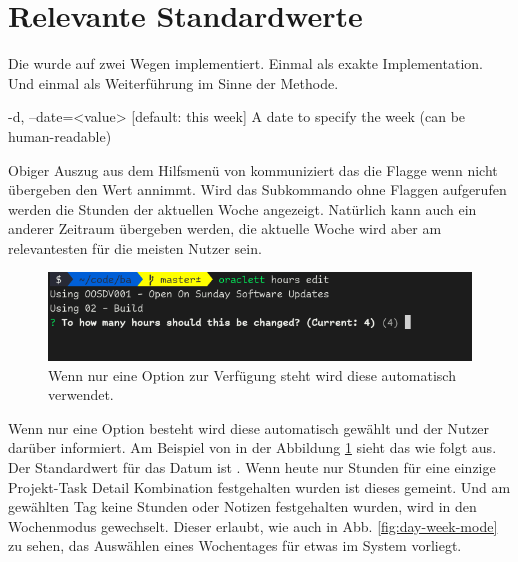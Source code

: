 \documentclass[oneside,bibliography=totocnumbered,BCOR=5mm]{scrbook}
\newenvironment{code}{\captionsetup{type=listing, skip=0pt}}{}
\begin{document}
\section{Relevante Standardwerte}
\label{sec:impl_defaults}


Die  wurde auf zwei Wegen implementiert. Einmal als
exakte Implementation. Und einmal als Weiterführung im Sinne der Methode.

\begin{code}
  \begin{shellcode}
-d, --date=<value>  [default: this week] A date to specify the week (can be human-readable)
  \end{shellcode}
  \medskip
\end{code}

Obiger Auszug aus dem Hilfsmenü von  kommuniziert das die
 Flagge wenn nicht übergeben den Wert 
annimmt. Wird das Subkommando  ohne Flaggen aufgerufen
werden die Stunden der aktuellen Woche angezeigt. Natürlich kann auch ein
anderer Zeitraum übergeben werden, die aktuelle Woche wird aber am relevantesten
für die meisten Nutzer sein.

\medskip

\begin{figure}
  \centering
  \includegraphics[scale=0.5]{hours-edit-defaults.png}
  \caption{Wenn nur eine Option zur Verfügung steht wird diese automatisch verwendet.}
  \label{fig:hours-edit-defaults}
\end{figure}

Wenn nur eine Option besteht wird diese automatisch gewählt und der Nutzer
darüber informiert. Am Beispiel von  in der Abbildung
\ref{fig:hours-edit-defaults} sieht das wie folgt aus. Der Standardwert für
das Datum ist . Wenn heute nur Stunden für eine einzige
Projekt-Task Detail Kombination festgehalten wurden ist dieses gemeint. Und
am gewählten Tag keine Stunden oder Notizen festgehalten wurden, wird in den
Wochenmodus gewechselt. Dieser erlaubt, wie auch in Abb. \ref{fig:day-week-mode}
zu sehen, das Auswählen eines Wochentages für etwas im System vorliegt.
\end{document}
